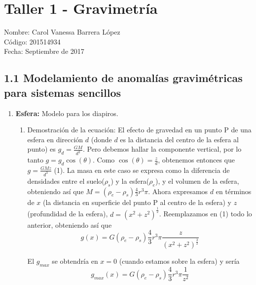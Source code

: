 \documentclass{article}
\begin{document}
\section*{Taller 1 - Gravimetr\'ia}
Nombre: Carol Vanessa Barrera L\'opez 
\\ C\'odigo: 201514934
\\Fecha: Septiembre de 2017

\subsection*{1.1 Modelamiento de anomal\'ias gravim\'etricas para sistemas sencillos} 

\begin{enumerate}%

\item {\bf Esfera:} Modelo para los diapiros.
	\begin{enumerate}
	\item Demostraci\'on de la ecuaci\'on:
	El efecto de gravedad en un punto P de una esfera en direcci\'on $d$ (donde $d$ es la distancia del centro de la esfera al punto) es  $g_d =\frac{GM}{d^{2}}$. Pero debemos hallar la componente vertical, por lo tanto $g = g_d\cos(\theta)$. Como $\cos(\theta)= \frac{z}{d}$, obtenemos entonces que $g =\frac{GMz}{d^{3}}$ (1). La masa en este caso se expresa como la diferencia de densidades entre el suelo($\rho_s$) y la esfera($\rho_e$), y el volumen de la esfera, obteniendo as\'i que $M = (\rho_e-\rho_s)\frac{4}{3}r^{3}\pi $. Ahora expresamos $d$ en t\'erminos de $x$ (la distancia en superficie del punto P al centro de la esfera) y $z$ (profundidad de la esfera), $d = (x^{2}+z^{2})^{\frac{1}{2}}$. Reemplazamos en (1) todo lo anterior, obteniendo as\'i que
\begin{equation*}
g(x) = G(\rho_e-\rho_s)\frac{4}{3}r^{3}\pi \frac{z}{(x^{2}+z^{2})^{\frac{3}{2}}}
\end{equation*}

El $g_{max}$ se obtendr\'ia en $x=0$ (cuando estamos sobre la esfera) y ser\'ia 
\begin{equation*}
g_{max}(x) = G(\rho_e-\rho_s)\frac{4}{3}r^{3}\pi \frac{1}{z^{2}}
\end{equation*}


\end{enumerate}
\end{enumerate}
\end{document}
